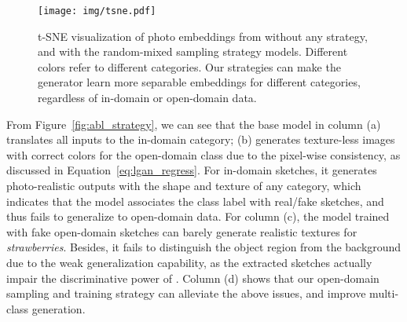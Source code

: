 \documentclass[10pt,twocolumn,letterpaper]{article}
\begin{document}
\begin{figure*}[htbp]
    \centering
    \texttt{[image: img/tsne.pdf]}
\caption{t-SNE visualization of photo embeddings from without any strategy, and with the random-mixed sampling strategy models. Different colors refer to different categories. Our strategies can make the generator learn more separable embeddings for different categories, regardless of in-domain or open-domain data.}
    \label{fig:tsne_strategies}
\end{figure*}

From Figure~\ref{fig:abl_strategy}, we can see that the base model in column (a) translates all inputs to the in-domain category; (b) generates texture-less images with correct colors for the open-domain class due to the pixel-wise consistency, as discussed in Equation~\ref{eq:lgan_regress}. For in-domain sketches, it generates photo-realistic outputs with the shape and texture of any category, which indicates that the model associates the class label with real/fake sketches, and thus fails to generalize to open-domain data. For column (c), the model trained with fake open-domain sketches can barely generate realistic textures for \textit{strawberries}. Besides, it fails to distinguish the object region from the background due to the weak generalization capability, as the extracted sketches actually impair the discriminative power of . Column (d) shows that our open-domain sampling and training strategy can alleviate the above issues, and improve multi-class generation. 
\end{document}
